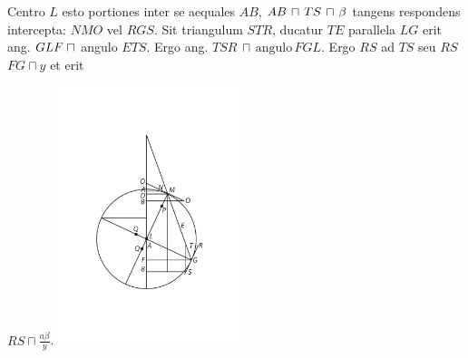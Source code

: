 \vspace*{8mm}
\count{}
\count{}
\pstart 
\normalsize
\noindent[3~r\textsuperscript{o}] Centro $L$ esto  portiones inter se aequales $AB$, $AB \hspace{0.5mm}\sqcap\hspace{0.5mm} TS\hspace{0.5mm} \sqcap \hspace{0.5mm}\beta$ tangens respondens intercepta: $NMO$ vel $RGS$. Sit triangulum $STR$, ducatur $TE$ parallela $LG$ erit ang. $GLF\hspace{1mm} \sqcap$ angulo $ETS$. Ergo ang. $TSR \, \sqcap \, \text{angulo} \, FGL$. Ergo $RS$ ad $TS$ seu $RS$  $FG \sqcap y$ et erit \rule[-4mm]{0mm}{10mm}$RS \sqcap \displaystyle\frac{a \beta}{y}$.
\pend
\vspace{1em}
\pstart
\noindent
\centering
\includegraphics[trim = 0mm -2mm 0mm 0mm, clip, width=0.4\textwidth]{images/lh0351009_003r_2-d2.pdf}\\
\noindent {}%
\pend
